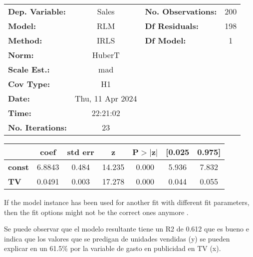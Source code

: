 \documentclass[11pt]{article}
\begin{document}
    \begin{center}
\begin{tabular}{lclc}
\toprule
\textbf{Dep. Variable:}  &      Sales       & \textbf{  No. Observations:  } &      200    \\
\textbf{Model:}          &       RLM        & \textbf{  Df Residuals:      } &      198    \\
\textbf{Method:}         &       IRLS       & \textbf{  Df Model:          } &        1    \\
\textbf{Norm:}           &      HuberT      & \textbf{                     } &             \\
\textbf{Scale Est.:}     &       mad        & \textbf{                     } &             \\
\textbf{Cov Type:}       &        H1        & \textbf{                     } &             \\
\textbf{Date:}           & Thu, 11 Apr 2024 & \textbf{                     } &             \\
\textbf{Time:}           &     22:21:02     & \textbf{                     } &             \\
\textbf{No. Iterations:} &        23        & \textbf{                     } &             \\
\bottomrule
\end{tabular}
\begin{tabular}{lcccccc}
               & \textbf{coef} & \textbf{std err} & \textbf{z} & \textbf{P$> |$z$|$} & \textbf{[0.025} & \textbf{0.975]}  \\
\midrule
\textbf{const} &       6.8843  &        0.484     &    14.235  &         0.000        &        5.936    &        7.832     \\
\textbf{TV}    &       0.0491  &        0.003     &    17.278  &         0.000        &        0.044    &        0.055     \\
\bottomrule
\end{tabular}
\end{center}

If the model instance has been used for another fit with different fit parameters, then the fit options might not be the correct ones anymore .

    

    Se puede observar que el modelo resultante tiene un R2 de 0.612 que es
bueno e indica que los valores que se predigan de unidades vendidas (y)
se pueden explicar en un 61.5\% por la variable de gasto en publicidad
en TV (x).
\end{document}
